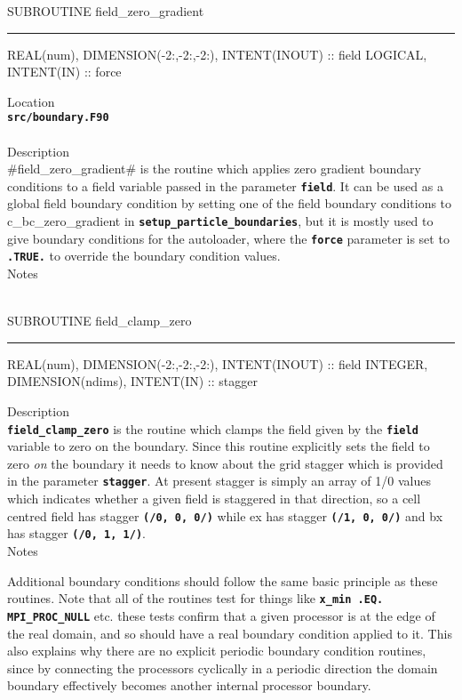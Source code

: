 \documentclass[12pt,a4paper]{article}
\newcommand{\HRule}{\rule[0.3cm]{\linewidth}{0.5mm}}
\newcommand{\inlinecode}[1]{{\color{warwickred} \bf\texttt{#1}}}
\begin{document}
\pagebreak
\begin{codedef}
SUBROUTINE field_zero_gradient
\HRule
REAL(num), DIMENSION(-2:,-2:,-2:), INTENT(INOUT) :: field
LOGICAL, INTENT(IN) :: force
\end{codedef}
\vspace{1cm}
{\Large Location\\}
\inlinecode{src/boundary.F90}\\
\\[0.5cm]
{\Large Description\\}
#field_zero_gradient# is the routine which applies zero gradient
boundary conditions to a field variable passed in the parameter
\inlinecode{field}. It can be used as a global field boundary condition by
setting one of the field boundary conditions to c\_bc\_zero\_gradient in
\inlinecode{setup\_particle\_boundaries}, but it is mostly used to give
boundary conditions for the autoloader, where the \inlinecode{force} parameter
is set to \inlinecode{.TRUE.} to override the boundary condition values.
\\[0.5cm]
{\Large Notes\\ \\}

\pagebreak
\begin{codedef}
SUBROUTINE field_clamp_zero
\HRule
REAL(num), DIMENSION(-2:,-2:,-2:), INTENT(INOUT) :: field
INTEGER, DIMENSION(ndims), INTENT(IN) :: stagger
\end{codedef}
\vspace{1cm}
{\Large Description\\}
\inlinecode{field\_clamp\_zero} is the routine which clamps the field given by
the \inlinecode{field} variable to zero on the boundary. Since this routine
explicitly sets the field to zero {\it on} the boundary it needs to know about
the grid stagger which is provided in the parameter \inlinecode{stagger}. At
present stagger is simply an array of 1/0 values which indicates whether a
given field is staggered in that direction, so a cell centred field has
stagger \inlinecode{(/0, 0, 0/)} while ex has stagger \inlinecode{(/1, 0, 0/)}
and bx has stagger \inlinecode{(/0, 1, 1/)}.
\\[0.5cm]
{\Large Notes\\}
\pagebreak

Additional boundary conditions should follow the same basic principle as these
routines. Note that all of the routines test for things like \inlinecode{x\_min
.EQ. MPI\_PROC\_NULL} etc. these tests confirm that a given processor is at the
edge of the real domain, and so should have a real boundary condition applied
to it. This also explains why there are no explicit periodic boundary condition
routines, since by connecting the processors cyclically in a periodic direction
the domain boundary effectively becomes another internal processor boundary.
\end{document}
